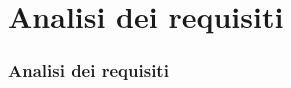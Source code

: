 
\section{Analisi dei requisiti}
\begin{frame}

  \frametitle{Analisi dei requisiti}

  
\end{frame}
